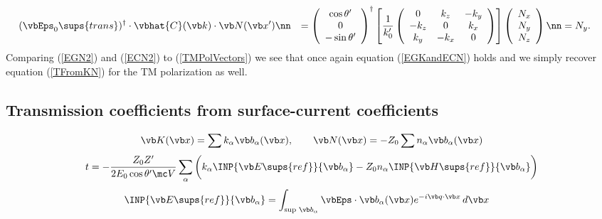\documentclass[letterpaper]{article}
\begin{document}
\begin{align}
&\hspace{-0.05in}
 (\vbEps_0\sups{trans})^\dagger \cdot
 \vbhat{C}(\vb k) \cdot \vb N(\vb x^\prime)
\nn
&=
 \left(\begin{array}{c}\cos\theta^\prime \\ 0 \\-\sin\theta^\prime \end{array}\right)^\dagger
 \left[ \frac{1}{k_0^{\prime}}
        \left(\begin{array}{ccc}
               0       & k_z     & -k_y    \\
               -k_z    & 0       & k_x     \\
               k_y     & -k_x    & 0
              \end{array}
        \right)
 \right]
 \left(\begin{array}{c}N_x \\ N_y \\ N_z\end{array}\right)
\nn
&=
 N_y.
\label{ECN2}
\end{align}
Comparing (\ref{EGN2}) and (\ref{ECN2}) to (\ref{TMPolVectors})
we see that once again equation (\ref{EGKandECN}) holds
and we simply recover equation (\ref{TFromKN}) for the 
TM polarization as well.

\newpage
\subsection*{Transmission coefficients from surface-current coefficients} 
$$ \vb K(\vb x)=\sum k_\alpha \vb b_\alpha(\vb x), \qquad 
   \vb N(\vb x)=-Z_0 \sum n_\alpha \vb b_\alpha(\vb x)
$$
$$ t=-\frac{Z_0 Z^\prime}{2E_0 \cos \theta^\prime \mc V}
      \sum_\alpha 
        \bigg( k_\alpha \INP{\vb E\sups{ref}}{\vb b_\alpha}
             -Z_0 n_\alpha \INP{\vb H\sups{ref}}{\vb b_\alpha}
        \bigg)
$$
\begin{align*}
 \INP{\vb E\sups{ref}}{\vb b_\alpha}
&=\int_{\text{sup } \vb b_\alpha}
  \vbEps \cdot \vb b_\alpha(\vb x)e^{-i\vb q \cdot \vb x}
  \, d\vb x
\end{align*}
\end{document}
